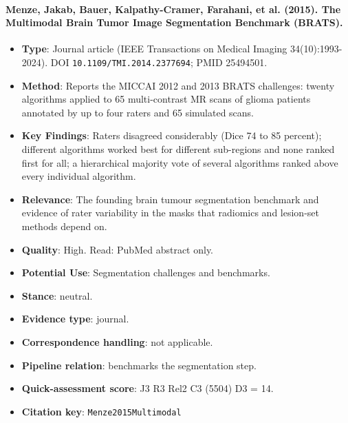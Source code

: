 \documentclass[journal,onecolumn]{IEEEtran}
\begin{document}
\paragraph{Menze, Jakab, Bauer, Kalpathy-Cramer, Farahani, et al. (2015). The Multimodal Brain Tumor Image Segmentation Benchmark (BRATS).~\cite{Menze2015Multimodal}}\mbox{}

\begin{itemize}

\item{} \textbf{Type}: Journal article (IEEE Transactions on Medical Imaging 34(10):1993-2024). DOI \nolinkurl{10.1109/TMI.2014.2377694}; PMID 25494501.

\item{} \textbf{Method}: Reports the MICCAI 2012 and 2013 BRATS challenges: twenty algorithms applied to 65 multi-contrast MR scans of glioma patients annotated by up to four raters and 65 simulated scans.

\item{} \textbf{Key Findings}: Raters disagreed considerably (Dice 74 to 85 percent); different algorithms worked best for different sub-regions and none ranked first for all; a hierarchical majority vote of several algorithms ranked above every individual algorithm.

\item{} \textbf{Relevance}: The founding brain tumour segmentation benchmark and evidence of rater variability in the masks that radiomics and lesion-set methods depend on.

\item{} \textbf{Quality}: High. Read: PubMed abstract only.

\item{} \textbf{Potential Use}: Segmentation challenges and benchmarks.

\item{} \textbf{Stance}: neutral.

\item{} \textbf{Evidence type}: journal.

\item{} \textbf{Correspondence handling}: not applicable.

\item{} \textbf{Pipeline relation}: benchmarks the segmentation step.

\item{} \textbf{Quick-assessment score}: J3 R3 Rel2 C3 (5504) D3 = 14.

\item{} \textbf{Citation key}: \texttt{Menze2015Multimodal}

\end{itemize}
\end{document}
